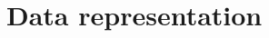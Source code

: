 \documentclass[../main.tex]{subfiles}
\begin{document}
%

\section{Data representation}
\label{sec:jgnn:data}
\end{document}
